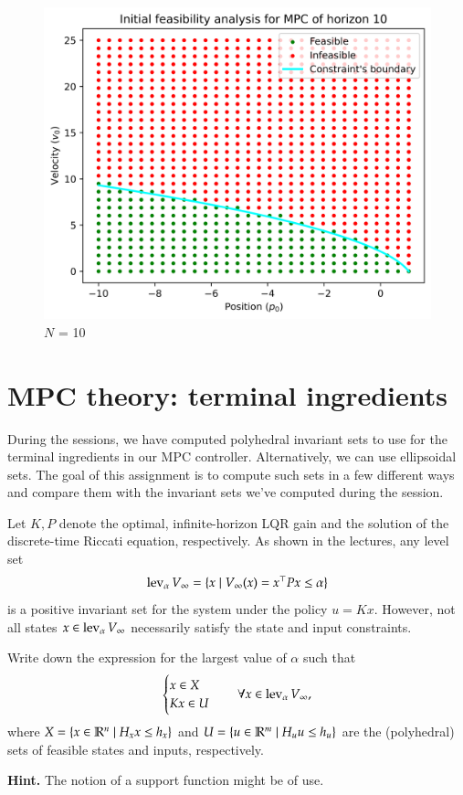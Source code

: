 \documentclass[]{article}
\begin{document}
\begin{figure}[H]
    \centering
    \begin{minipage}{0.7\textwidth}
        \centering
        \includegraphics[width=\textwidth]{images/Assignment_24_N10.png}
        \caption{$N$ = 10}
        \label{fig:assignment2_4_3}
    \end{minipage}
\end{figure}



\newpage
\section{MPC theory: terminal ingredients}
During the sessions, we have computed polyhedral invariant sets to use 
for the terminal ingredients in our MPC controller. 
Alternatively, we can use ellipsoidal sets. 
The goal of this assignment is to compute such sets in a few different ways 
and compare them with the invariant sets we've computed during 
the session.

\begin{assignment} \label{sess3:assign-lqr}
	Let $K, P$ denote the optimal, infinite-horizon LQR gain and the solution of 
	the discrete-time Riccati equation, respectively. As shown in the lectures, 
	any level set
	\[ 
		\operatorname{lev}_{\alpha} V_{\infty} = \{x \mid V_{\infty}(x) = x^\top P x \leq \alpha\}
	\]
	is a positive invariant set for the system under the policy $u = Kx$. However, 
	not all states $x \in \operatorname{lev}_{\alpha} V_{\infty}$ necessarily satisfy the state and input constraints. 

	Write down the expression for the largest value of $\alpha$ 
	such that
	\[ 
	\begin{cases}
		x \in X \\
		Kx \in U  
	\end{cases} \quad \forall x \in \operatorname{lev}_{\alpha} V_{\infty},
	\]
	where $X = \{x \in \mathbb{R}^n \mid H_x x \leq h_x\}$ and $U = \{u \in \mathbb{R}^m \mid H_u u \leq h_u \}$ are 
	the (polyhedral) sets of feasible states and inputs, respectively.

	\textbf{Hint.} The notion of a support function might be of use.
\end{assignment}
\end{document}
